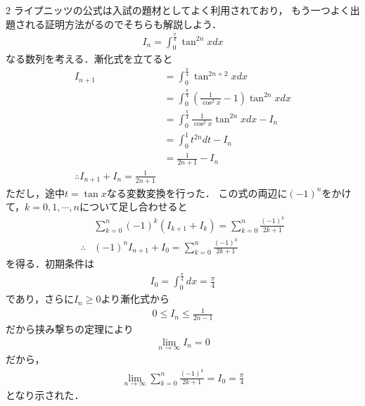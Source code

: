 \documentclass[../../main.tex]{subfiles}
\begin{document}
\begin{multicols}{2}
  ライプニッツの公式は入試の題材としてよく利用されており，
  もう一つよく出題される証明方法がるのでそちらも解説しよう．
  \begin{align*}
    I_n = \int_{0}^{\frac{\pi}{4}} \tan^{2n}x dx
  \end{align*}
  なる数列を考える．漸化式を立てると
  \begin{align*}
    I_{n+1}
     & = \int_{0}^{\frac{\pi}{4}} \tan^{2n+2}x dx                               \\
     & = \int_{0}^{\frac{\pi}{4}} \left(\frac{1}{\cos^2x}-1\right)\tan^{2n}x dx \\
     & = \int_{0}^{\frac{\pi}{4}} \frac{1}{\cos^2x}\tan^{2n}x dx - I_n          \\
     & = \int_{0}^{1} t^{2n} dt - I_n                                           \\
     & = \frac{1}{2n+1} - I_n                                                   \\
    \therefore
    I_{n+1} + I_{n} = \frac{1}{2n+1}
  \end{align*}
  ただし，途中$t=\tan x$なる変数変換を行った．
  この式の両辺に$(-1)^{n}$をかけて，$k=0,1,\cdots,n$について足し合わせると
  \begin{align*}
     & \sum_{k=0}^{n} (-1)^{k}\left(I_{k+1} + I_{k}\right) = \sum_{k=0}^{n} \frac{(-1)^{k}}{2k+1} \\
    \therefore
     & (-1)^{n}I_{n+1} + I_0 = \sum_{k=0}^{n} \frac{(-1)^{k}}{2k+1}
  \end{align*}
  を得る．初期条件は
  \begin{align*}
    I_0 = \int_{0}^{\frac{\pi}{4}} dx = \frac{\pi}{4}
  \end{align*}
  であり，さらに$I_{n}\ge 0$より漸化式から
  \begin{align*}
    0 \le I_{n} \le \frac{1}{2n-1}
  \end{align*}
  だから挟み撃ちの定理により
  \begin{align*}
    \lim_{n\to\infty} I_{n} = 0
  \end{align*}
  だから，
  \begin{align*}
    \lim_{n\to\infty} \sum_{k=0}^{n} \frac{(-1)^{k}}{2k+1} = I_0 = \frac{\pi}{4}
  \end{align*}
  となり示された．

  \newpage
\end{multicols}
\end{document}
